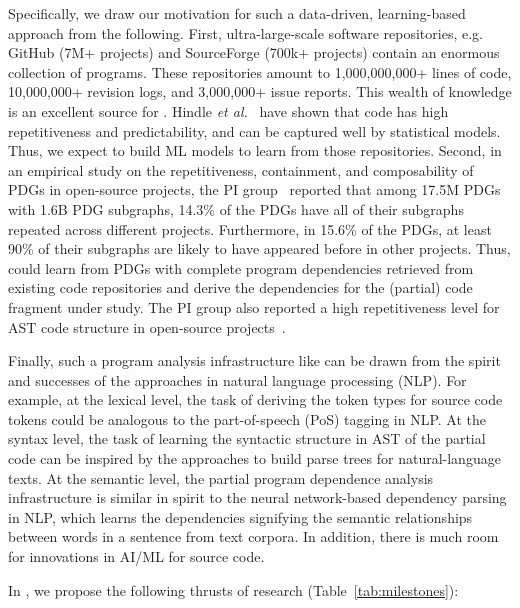 Specifically, we draw our motivation for such a data-driven,
learning-based approach from the following. First, ultra-large-scale
software repositories, e.g. GitHub (7M+ projects) and SourceForge
(700k+ projects) contain an enormous collection of programs. These
repositories amount to 1,000,000,000+ lines of code, 10,000,000+
revision logs, and 3,000,000+ issue reports. This wealth of knowledge
is an excellent source for {\tool}. Hindle {\em et
  al.}~\cite{naturalness-icse12} have shown that code has high
repetitiveness and predictability, and can be captured well by
statistical models. Thus, we expect to build ML models to learn from
those repositories. Second, in an empirical study on the
repetitiveness, containment, and composability of PDGs in open-source
projects, the PI group~\cite{msr16} reported that among
17.5M PDGs with 1.6B PDG subgraphs, 14.3\% of the PDGs have all of
their subgraphs repeated across different projects. Furthermore, in
15.6\% of the PDGs, at least 90\% of their subgraphs are likely to
have appeared before in other projects. Thus, {\tool} could learn from
PDGs with complete program dependencies retrieved from existing code
repositories and derive the dependencies for the (partial) code
fragment under study. The PI group also reported a high repetitiveness
level for AST code structure in open-source
projects~\cite{icse15}.

Finally, such a program analysis infrastructure like {\tool} can be
drawn from the spirit and successes of the approaches in natural
language processing (NLP). For example, at the lexical level, the task
of deriving the token types for source code tokens could be analogous
to the part-of-speech (PoS) tagging in NLP. At the syntax level, the
task of learning the syntactic structure in AST of the partial code
can be inspired by the approaches to build parse trees for
natural-language texts. At the semantic level, the partial program
dependence analysis infrastructure is similar in spirit to the neural
network-based dependency parsing in NLP, which learns the dependencies
signifying the semantic relationships between words in a sentence from
text corpora. In addition, there is much room for innovations in AI/ML
for source code.




In {\tool}, we propose the following thrusts of research
(Table~\ref{tab:milestones}):

